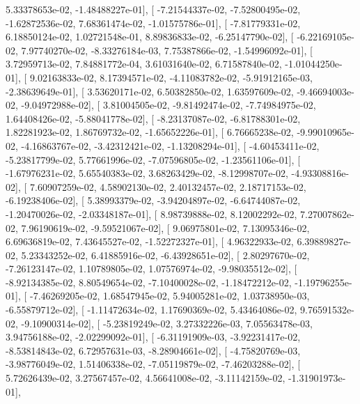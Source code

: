 \documentclass{article}
\begin{document}
          5.33378653e-02,  -1.48488227e-01],
       [ -7.21544337e-02,  -7.52800495e-02,  -1.62872536e-02,
          7.68361474e-02,  -1.01575786e-01],
       [ -7.81779331e-02,   6.18850124e-02,   1.02721548e-01,
          8.89836833e-02,  -6.25147790e-02],
       [ -6.22169105e-02,   7.97740270e-02,  -8.33276184e-03,
          7.75387866e-02,  -1.54996092e-01],
       [  3.72959713e-02,   7.84881772e-04,   3.61031640e-02,
          6.71587840e-02,  -1.01044250e-01],
       [  9.02163833e-02,   8.17394571e-02,  -4.11083782e-02,
         -5.91912165e-03,  -2.38639649e-01],
       [  3.53620171e-02,   6.50382850e-02,   1.63597609e-02,
         -9.46694003e-02,  -9.04972988e-02],
       [  3.81004505e-02,  -9.81492474e-02,  -7.74984975e-02,
          1.64408426e-02,  -5.88041778e-02],
       [ -8.23137087e-02,  -6.81788301e-02,   1.82281923e-02,
          1.86769732e-02,  -1.65652226e-01],
       [  6.76665238e-02,  -9.99010965e-02,  -4.16863767e-02,
         -3.42312421e-02,  -1.13208294e-01],
       [ -4.60453411e-02,  -5.23817799e-02,   5.77661996e-02,
         -7.07596805e-02,  -1.23561106e-01],
       [ -1.67976231e-02,   5.65540383e-02,   3.68263429e-02,
         -8.12998707e-02,  -4.93308816e-02],
       [  7.60907259e-02,   4.58902130e-02,   2.40132457e-02,
          2.18717153e-02,  -6.19238406e-02],
       [  5.38993379e-02,  -3.94204897e-02,  -6.64744087e-02,
         -1.20470026e-02,  -2.03348187e-01],
       [  8.98739888e-02,   8.12002292e-02,   7.27007862e-02,
          7.96190619e-02,  -9.59521067e-02],
       [  9.06975801e-02,   7.13095346e-02,   6.69636819e-02,
          7.43645527e-02,  -1.52272327e-01],
       [  4.96322933e-02,   6.39889827e-02,   5.23343252e-02,
          6.41885916e-02,  -6.43928651e-02],
       [  2.80297670e-02,  -7.26123147e-02,   1.10789805e-02,
          1.07576974e-02,  -9.98035512e-02],
       [ -8.92134385e-02,   8.80549654e-02,  -7.10400028e-02,
         -1.18472212e-02,  -1.19796255e-01],
       [ -7.46269205e-02,   1.68547945e-02,   5.94005281e-02,
          1.03738950e-03,  -6.55879712e-02],
       [ -1.11472634e-02,   1.17690369e-02,   5.43464086e-02,
          9.76591532e-02,  -9.10900314e-02],
       [ -5.23819249e-02,   3.27332226e-03,   7.05563478e-03,
          3.94756188e-02,  -2.02299092e-01],
       [ -6.31191909e-03,  -3.92231417e-02,  -8.53814843e-02,
          6.72957631e-03,  -8.28904661e-02],
       [ -4.75820769e-03,  -3.98776049e-02,   1.51406338e-02,
         -7.05119879e-02,  -7.46203288e-02],
       [  5.72626439e-02,   3.27567457e-02,   4.56641008e-02,
         -3.11142159e-02,  -1.31901973e-01],
\end{document}
